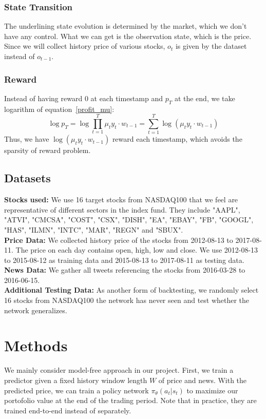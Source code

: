 \documentclass[a4paper, 10pt]{article}
\begin{document}
\begin{spacing}{1.2}
    \subsubsection{State Transition}
    The underlining state evolution is determined by the market, which we don't have any control. What we can get is the observation state, which is the price. Since we will collect history price of various stocks, $o_t$ is given by the dataset instead of $o_{t-1}$.\\
    \subsubsection{Reward}
    Instead of having reward 0 at each timestamp and $p_T$ at the end, we take logarithm of equation~\ref{profit_mu}:
    \begin{equation}
    \log{p_T}=\log{\prod_{t=1}^{T}\mu_t y_t\cdot w_{t-1}}=\sum_{t=1}^{T}\log(\mu_t y_t\cdot w_{t-1})
    \end{equation}
    Thus, we have $\log(\mu_t y_t\cdot w_{t-1})$ reward each timestamp, which avoids the sparsity of reward problem.
    
    \subsection{Datasets}
    \textbf{Stocks used:}
    We use 16 target stocks from NASDAQ100 that we feel are representative of different sectors in the index fund. They include "AAPL", "ATVI", "CMCSA", "COST", "CSX", "DISH", "EA", "EBAY", "FB", "GOOGL", "HAS", "ILMN", "INTC", "MAR", "REGN" and "SBUX".\\
    \textbf{Price Data:}
    We collected history price of the stocks from 2012-08-13 to 2017-08-11. The price on each day contains open, high, low and close. We use 2012-08-13 to 2015-08-12 as training data and 2015-08-13 to 2017-08-11 as testing data.\\
    \textbf{News Data:}
    We gather all tweets referencing the stocks from 2016-03-28 to 2016-06-15.\\
    \textbf{Additional Testing Data:}
    As another form of backtesting, we randomly select 16 stocks from NASDAQ100 the network has never seen and test whether the network generalizes.
    
    \section{Methods}
    We mainly consider model-free approach in our project. First, we train a predictor given a fixed history window length $W$ of price and news. With the predicted price, we can train a policy network $\pi_{\theta}(a_t|s_t)$ to maximize our portofolio value at the end of the trading period. Note that in practice, they are trained end-to-end instead of separately.
    

\end{spacing}
\end{document}
